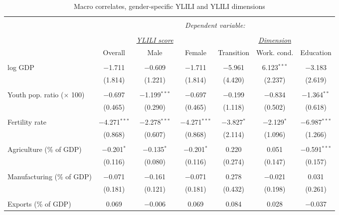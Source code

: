 \documentclass[
  a4paper, twoside, 12pt]{book}
\begin{document}
\begin{singlespace}

\begin{table}[H] \centering 
  \caption{Macro correlates, gender-specific YLILI and YLILI dimensions} 
  \label{tab:tbl-regwide} 
\footnotesize 
\begin{tabular}{@{\extracolsep{-8pt}}lcccccc} 
\\[-1.8ex]\hline 
\hline \\[-1.8ex] 
 & \multicolumn{6}{c}{\textit{Dependent variable:}} \\ 
\cline{2-7} 
\\[-1.8ex] &  & \textit{\underline{YLILI score}} &  &  & \textit{\underline{Dimension}} &  \\ 
 & Overall & Male & Female & Transition & Work. cond. & Education \\ 
\hline \\[-1.8ex] 
 log GDP & $-$1.711 & $-$0.609 & $-$1.711 & $-$5.961 & 6.123$^{***}$ & $-$3.183 \\ 
  & (1.814) & (1.221) & (1.814) & (4.420) & (2.237) & (2.619) \\ 
  & & & & & & \\ 
 Youth pop. ratio ($\times$ 100) & $-$0.697 & $-$1.199$^{***}$ & $-$0.697 & $-$0.199 & $-$0.834 & $-$1.364$^{**}$ \\ 
  & (0.465) & (0.290) & (0.465) & (1.118) & (0.502) & (0.618) \\ 
  & & & & & & \\ 
 Fertility rate & $-$4.271$^{***}$ & $-$2.278$^{***}$ & $-$4.271$^{***}$ & $-$3.827$^{*}$ & $-$2.129$^{*}$ & $-$6.987$^{***}$ \\ 
  & (0.868) & (0.607) & (0.868) & (2.114) & (1.096) & (1.266) \\ 
  & & & & & & \\ 
 Agriculture (\% of GDP) & $-$0.201$^{*}$ & $-$0.135$^{*}$ & $-$0.201$^{*}$ & 0.220 & 0.051 & $-$0.591$^{***}$ \\ 
  & (0.116) & (0.080) & (0.116) & (0.274) & (0.147) & (0.157) \\ 
  & & & & & & \\ 
 Manufacturing (\% of GDP) & $-$0.071 & $-$0.161 & $-$0.071 & 0.278 & $-$0.021 & 0.031 \\ 
  & (0.181) & (0.121) & (0.181) & (0.432) & (0.198) & (0.261) \\ 
  & & & & & & \\ 
 Exports (\% of GDP) & 0.069 & $-$0.006 & 0.069 & 0.084 & 0.028 & $-$0.037 \\ 

\end{tabular}
\end{table}
\end{singlespace}
\end{document}
